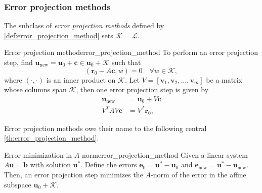 \subsubsection{Error projection methods}
The subclass of \textit{error projection methods} defined by \cref{def:error_projection_method} sets $\mathcal{K} = \mathcal{L}$.
\begin{fancydef}{Error projection method}{error_projection_method}
  To perform an error projection step, find $\mathbf{u}_{\text{new}} = \mathbf{u}_0 + \mathbf{c} \in \mathbf{u}_0 + \mathcal{K}$ such that
  \begin{equation}
    (\mathbf{r}_0 - A\mathbf{c}, w) = 0 \quad \forall w \in \mathcal{K},
    \label{eq:orthogonality_condition}
  \end{equation}
  where $(\cdot,\cdot)$ is an inner product on $\mathcal{K}$. Let $V = [\mathbf{v}_1, \mathbf{v}_2, \dots, \mathbf{v}_m]$ be a matrix whose columns span $\mathcal{K}$, then one error projection step is given by
  \begin{align*}
    \mathbf{u}_{\text{new}} & = \mathbf{u}_0 + V \mathbf{c} \\
    V^TAV\mathbf{c} & = V^T\mathbf{r}_0,
  \end{align*}
  \label{def:error_projection_method}
\end{fancydef}
Error projection methods owe their name to the following central \cref{th:error_projection_method}.
\begin{fancyth}{Error minimization in $A$-norm}{error_projection_method}
  Given a linear system $A\mathbf{u} = \mathbf{b}$ with solution $\mathbf{u}^{*}$. Define the errors $\mathbf{e}_0 = \mathbf{u}^{*} - \mathbf{u}_0$ and $\mathbf{e}_{\text{new}} = \mathbf{u}^{*} - \mathbf{u}_{\text{new}}$. Then, an error projection step minimizes the $A$-norm of the error in the affine subspace $\mathbf{u}_0 + \mathcal{K}$.
\end{fancyth}
